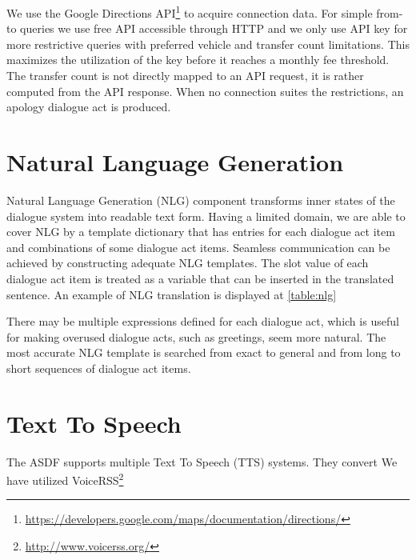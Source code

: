 We use the Google Directions API\footnote{\url{https://developers.google.com/maps/documentation/directions/}} to acquire connection data.
For simple from-to queries we use free API accessible through HTTP and we only use API key for more restrictive queries with preferred vehicle and transfer count limitations.
This maximizes the utilization of the key before it reaches a monthly fee threshold.
The transfer count is not directly mapped to an API request, it is rather computed from the API response.
When no connection suites the restrictions, an apology dialogue act is produced.

\section{Natural Language Generation}

Natural Language Generation (NLG) component transforms inner states of the dialogue system into readable text form.
Having a limited domain, we are able to cover NLG by a template dictionary that has entries for each dialogue act item and combinations of some dialogue act items.
Seamless communication can be achieved by constructing adequate NLG templates.
The slot value of each dialogue act item is treated as a variable that can be inserted in the translated sentence.
An example of NLG translation is displayed at \ref{table:nlg}

\begin{table}[h]
\centering
\small
\hspace*{-3pt}
\caption{Translation example of dialogue act to sentence by Natural Language Generation component}
\label{table:nlg}
\end{table}

There may be multiple expressions defined for each dialogue act, which is useful for making overused dialogue acts, such as greetings, seem more natural.
The most accurate NLG template is searched from exact to general and from long to short sequences of dialogue act items.

\section{Text To Speech}

The ASDF supports multiple Text To Speech (TTS) systems. They convert
We have utilized VoiceRSS\footnote{\url{http://www.voicerss.org/}}

